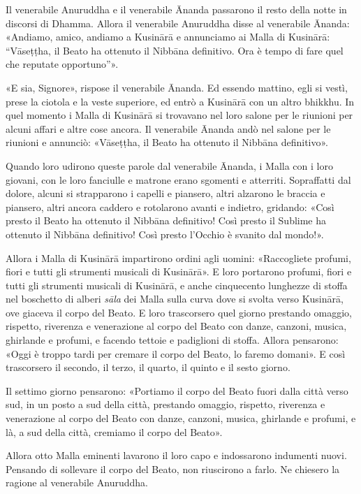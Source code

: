 Il venerabile Anuruddha e il venerabile Ānanda passarono il resto della notte in
discorsi di Dhamma. Allora il venerabile Anuruddha disse al venerabile Ānanda:
«Andiamo, amico, andiamo a Kusinārā e annunciamo ai Malla di Kusinārā:
“Vāseṭṭha, il Beato ha ottenuto il Nibbāna definitivo. Ora è tempo di fare quel
che reputate opportuno”».

«E sia, Signore», rispose il venerabile Ānanda. Ed essendo mattino, egli si
vestì, prese la ciotola e la veste superiore, ed entrò a Kusinārā con un altro
bhikkhu. In quel momento i Malla di Kusinārā si trovavano nel loro salone per le
riunioni per alcuni affari e altre cose ancora. Il venerabile Ānanda andò nel
salone per le riunioni e annunciò: «Vāseṭṭha, il Beato ha ottenuto il Nibbāna
definitivo».

Quando loro udirono queste parole dal venerabile Ānanda, i Malla con i loro
giovani, con le loro fanciulle e matrone erano sgomenti e atterriti. Sopraffatti
dal dolore, alcuni si strapparono i capelli e piansero, altri alzarono le
braccia e piansero, altri ancora caddero e rotolarono avanti e indietro,
gridando: «Così presto il Beato ha ottenuto il Nibbāna definitivo! Così presto
il Sublime ha ottenuto il Nibbāna definitivo! Così presto l’Occhio è svanito dal
mondo!».

Allora i Malla di Kusinārā impartirono ordini agli uomini: «Raccogliete profumi,
fiori e tutti gli strumenti musicali di Kusinārā». E loro portarono profumi,
fiori e tutti gli strumenti musicali di Kusinārā, e anche cinquecento lunghezze
di stoffa nel boschetto di alberi \emph{sāla} dei Malla sulla curva dove si
svolta verso Kusinārā, ove giaceva il corpo del Beato. E loro trascorsero quel
giorno prestando omaggio, rispetto, riverenza e venerazione al corpo del Beato
con danze, canzoni, musica, ghirlande e profumi, e facendo tettoie e padiglioni
di stoffa. Allora pensarono: «Oggi è troppo tardi per cremare il corpo del
Beato, lo faremo domani». E così trascorsero il secondo, il terzo, il quarto, il
quinto e il sesto giorno.

Il settimo giorno pensarono: «Portiamo il corpo del Beato fuori dalla città
verso sud, in un posto a sud della città, prestando omaggio, rispetto, riverenza
e venerazione al corpo del Beato con danze, canzoni, musica, ghirlande e
profumi, e là, a sud della città, cremiamo il corpo del Beato».

Allora otto Malla eminenti lavarono il loro capo e indossarono indumenti nuovi.
Pensando di sollevare il corpo del Beato, non riuscirono a farlo. Ne chiesero la
ragione al venerabile Anuruddha.

